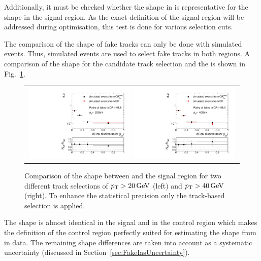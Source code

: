 Additionally, it must be checked whether the \ias shape in \fakeCR is representative for the \ias shape in the signal region.
As the exact definition of the signal region will be addressed during optimisation, this test is done for various \pt selection cuts.

The comparison of the \ias shape of fake tracks can only be done with simulated events.
Thus, simulated \WJets events are used to select fake tracks in both regions.
A comparison of the shape for the candidate track selection and the \fakeCR is shown in Fig.~\ref{fig:IasSRCRFakes}.
\begin{figure}[!b]
  \centering 
  \begin{tabular}{c}
    \includegraphics[width=0.49\textwidth]{figures/analysis/Background/hASmi_fakes_ECalaoLe5_trackPtGt20.pdf}
    \includegraphics[width=0.49\textwidth]{figures/analysis/Background/hASmi_fakes_ECalaoLe5_trackPtGt40.pdf}
  \end{tabular}
  \caption{Comparison of the \ias shape between \fakeCR and the signal region for two different track \pt selections of $p_{\text{T}}>20\,\text{Ge}\kern-0.06667em\text{V}$ (left) and $p_{\text{T}}>40\,\text{Ge}\kern-0.06667em\text{V}$ (right). 
           To enhance the statistical precision only the track-based selection is applied.}
  \label{fig:IasSRCRFakes}
\end{figure}

The \ias shape is almost identical in the signal and in the control region which makes the definition of the control region perfectly suited for estimating the \ias shape from \fakeCR in data.
The remaining shape differences are taken into account as a systematic uncertainty (discussed in Section~\ref{sec:FakeIasUncertainty}).
\FloatBarrier
